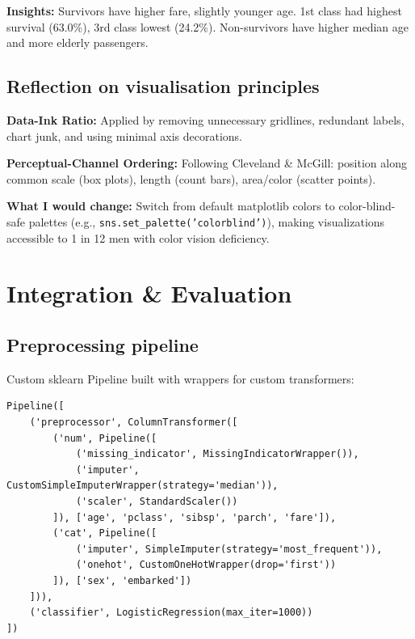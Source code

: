 \documentclass[12pt]{article}
\begin{document}
\textbf{Insights:} Survivors have higher fare, slightly younger age. 1st class had highest survival (63.0\%), 3rd class lowest (24.2\%). Non-survivors have higher median age and more elderly passengers.

\subsection{Reflection on visualisation principles}

\textbf{Data-Ink Ratio:} Applied by removing unnecessary gridlines, redundant labels, chart junk, and using minimal axis decorations.

\textbf{Perceptual-Channel Ordering:} Following Cleveland \& McGill: position along common scale (box plots), length (count bars), area/color (scatter points).

\textbf{What I would change:} Switch from default matplotlib colors to color-blind-safe palettes (e.g., \texttt{sns.set\_palette('colorblind')}), making visualizations accessible to 1 in 12 men with color vision deficiency.


\section{Integration \& Evaluation}

\subsection{Preprocessing pipeline}

Custom sklearn Pipeline built with wrappers for custom transformers:

\begin{lstlisting}[caption=Pipeline Structure]
Pipeline([
    ('preprocessor', ColumnTransformer([
        ('num', Pipeline([
            ('missing_indicator', MissingIndicatorWrapper()),
            ('imputer', CustomSimpleImputerWrapper(strategy='median')),
            ('scaler', StandardScaler())
        ]), ['age', 'pclass', 'sibsp', 'parch', 'fare']),
        ('cat', Pipeline([
            ('imputer', SimpleImputer(strategy='most_frequent')),
            ('onehot', CustomOneHotWrapper(drop='first'))
        ]), ['sex', 'embarked'])
    ])),
    ('classifier', LogisticRegression(max_iter=1000))
])
\end{lstlisting}
\end{document}
